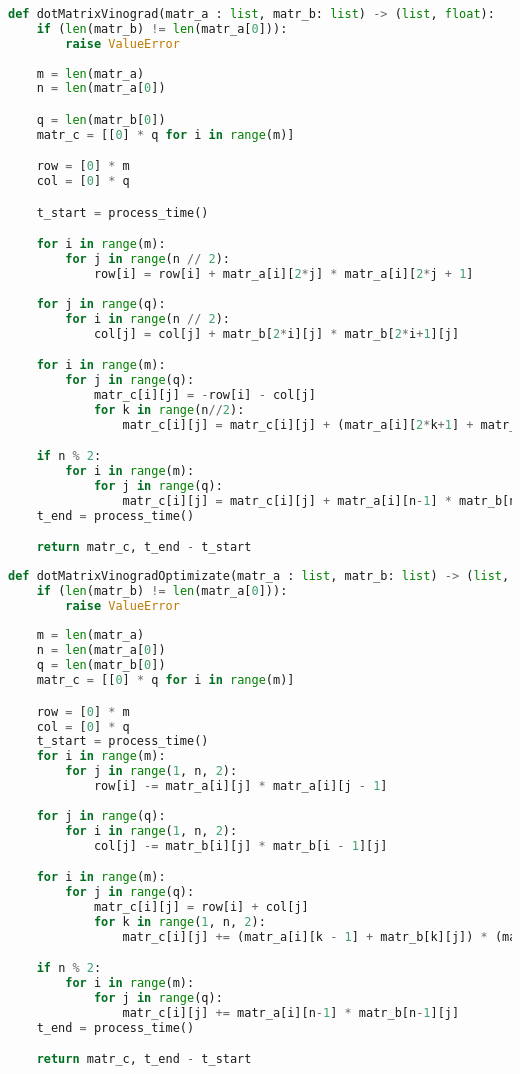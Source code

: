         \begin{lstlisting}[language=python, label=lst:vinogradDot, caption=Реализация алгоритма Винограда умножения матриц]
def dotMatrixVinograd(matr_a : list, matr_b: list) -> (list, float):
    if (len(matr_b) != len(matr_a[0])):
        raise ValueError
    
    m = len(matr_a)
    n = len(matr_a[0])

    q = len(matr_b[0])
    matr_c = [[0] * q for i in range(m)]

    row = [0] * m
    col = [0] * q

    t_start = process_time()

    for i in range(m):
        for j in range(n // 2):
            row[i] = row[i] + matr_a[i][2*j] * matr_a[i][2*j + 1]
    
    for j in range(q):
        for i in range(n // 2):
            col[j] = col[j] + matr_b[2*i][j] * matr_b[2*i+1][j]

    for i in range(m):
        for j in range(q):
            matr_c[i][j] = -row[i] - col[j]
            for k in range(n//2):
                matr_c[i][j] = matr_c[i][j] + (matr_a[i][2*k+1] + matr_b[2*k][j]) * (matr_a[i][2*k] + matr_b[2*k+1][j])

    if n % 2:
        for i in range(m):
            for j in range(q):
                matr_c[i][j] = matr_c[i][j] + matr_a[i][n-1] * matr_b[n-1][j]
    t_end = process_time()

    return matr_c, t_end - t_start
        \end{lstlisting}

        \begin{lstlisting}[language=python, label=lst:vinogradDot:optimize, caption=Реализация оптимизированного алгоритма Винограда умножения матриц]
def dotMatrixVinogradOptimizate(matr_a : list, matr_b: list) -> (list, float):
    if (len(matr_b) != len(matr_a[0])):
        raise ValueError
    
    m = len(matr_a)
    n = len(matr_a[0])
    q = len(matr_b[0])
    matr_c = [[0] * q for i in range(m)]

    row = [0] * m
    col = [0] * q
    t_start = process_time()
    for i in range(m):
        for j in range(1, n, 2):
            row[i] -= matr_a[i][j] * matr_a[i][j - 1]
    
    for j in range(q):
        for i in range(1, n, 2):
            col[j] -= matr_b[i][j] * matr_b[i - 1][j]

    for i in range(m):
        for j in range(q):
            matr_c[i][j] = row[i] + col[j]
            for k in range(1, n, 2):
                matr_c[i][j] += (matr_a[i][k - 1] + matr_b[k][j]) * (matr_a[i][k] + matr_b[k-1][j])

    if n % 2:
        for i in range(m):
            for j in range(q):
                matr_c[i][j] += matr_a[i][n-1] * matr_b[n-1][j]
    t_end = process_time()

    return matr_c, t_end - t_start
        \end{lstlisting}
    
